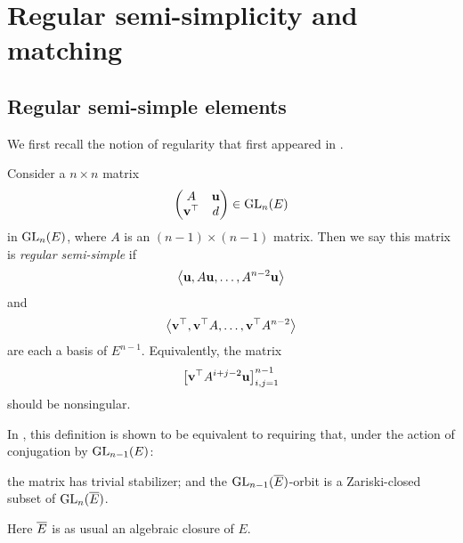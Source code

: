 \chapter{Regular semi-simplicity and matching}
\label{ch:rs_matching}

\section{Regular semi-simple elements}
We first recall the notion of regularity
that first appeared in \cite[\S6]{ref:multoneconj}.

\begin{definition}
  \label{def:rs}
  Consider a $n \times n$ matrix
  \[ \begin{pmatrix} A & \mathbf u \\ \mathbf v^\top & d \end{pmatrix} \in \operatorname{GL}_n(E) \]
  in $\operatorname{GL}_n(E)$, where $A$ is an $(n-1) \times (n-1)$ matrix.
  Then we say this matrix is \emph{regular semi-simple} if
  \[ \left< \mathbf u, A\mathbf u, \dots, A^{n-2}\mathbf u \right> \]
  and \[ \left< \mathbf v^\top, \mathbf v^\top A, \dots, \mathbf v^\top A^{n-2} \right> \]
  are each a basis of $E^{n-1}$.
  Equivalently, the matrix
  \[ \left[ \mathbf v^\top A^{i+j-2} \mathbf u \right]_{i,j=1}^{n-1} \]
  should be nonsingular.
\end{definition}

\begin{remark}
  In \cite[Theorem 6.1]{ref:multoneconj}, this definition is shown to be equivalent to
  requiring that, under the action of conjugation by $\operatorname{GL}_{n-1}(E)$:
  \begin{itemize}
  \ii the matrix has trivial stabilizer; and
  \ii the $\operatorname{GL}_{n-1}(\overline E)$-orbit is a Zariski-closed subset of $\operatorname{GL}_n(\overline E)$.
  \end{itemize}
  Here $\overline E$ is as usual an algebraic closure of $E$.
\end{remark}


